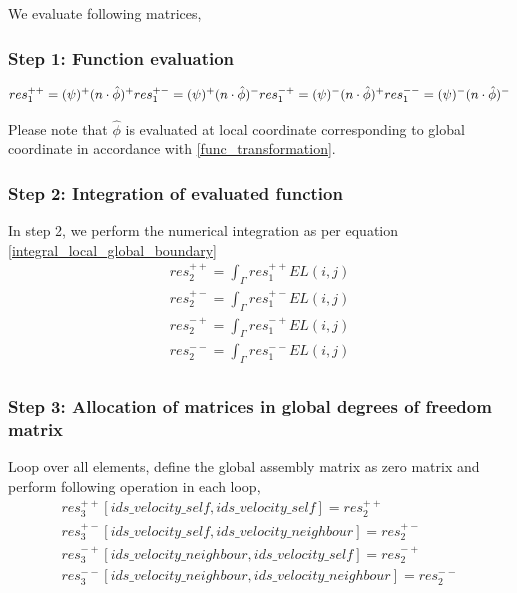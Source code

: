 \documentclass[a4paper,openany]{book}
\begin{document}
We evaluate following matrices, 

\subsubsection{Step 1: Function evaluation}
\begin{equation}
res_1^{++} = (\psi)^+ (n \cdot \hat{\phi})^+\\
res_1^{+-} = (\psi)^+ (n \cdot \hat{\phi})^-\\
res_1^{-+} = (\psi)^- (n \cdot \hat{\phi})^+\\
res_1^{--} = (\psi)^- (n \cdot \hat{\phi})^-\\
\end{equation}

Please note that $\hat{\phi}$ is evaluated at local coordinate corresponding to global coordinate in accordance with \ref{func_transformation}.

\subsubsection{Step 2: Integration of evaluated function}

In step 2, we perform the numerical integration as per equation \ref{integral_local_global_boundary}
\begin{equation}
\begin{split}
res_2^{++} = \int_{\Gamma} res_1^{++} EL(i,j)\\
res_2^{+-} = \int_{\Gamma} res_1^{+-} EL(i,j)\\
res_2^{-+} = \int_{\Gamma} res_1^{-+} EL(i,j)\\
res_2^{--} = \int_{\Gamma} res_1^{--} EL(i,j)\\
\end{split}
\end{equation}

\subsubsection{Step 3: Allocation of matrices in global degrees of freedom matrix} 

Loop over all elements, define the global assembly matrix as zero matrix and perform following operation in each loop,
\begin{equation}
\begin{split}
res_3^{++}[ids\_velocity\_self,ids\_velocity\_self] = res_2^{++}\\
res_3^{+-}[ids\_velocity\_self,ids\_velocity\_neighbour] = res_2^{+-}\\
res_3^{-+}[ids\_velocity\_neighbour,ids\_velocity\_self] = res_2^{-+}\\
res_3^{--}[ids\_velocity\_neighbour,ids\_velocity\_neighbour] = res_2^{--}\\
\end{split}
\end{equation}
\end{document}
